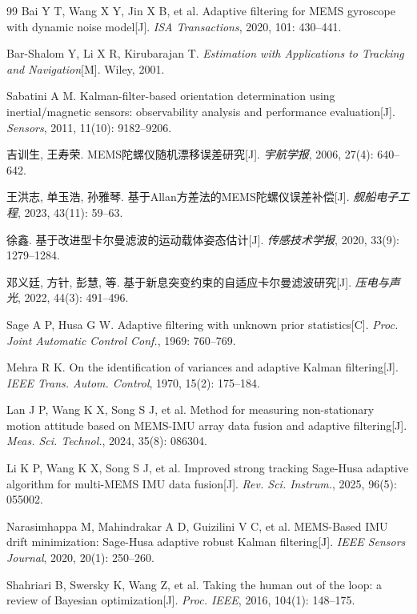 \documentclass{rjthesis}
\begin{document}
\begin{thebibliography}{99}
 Bai Y T, Wang X Y, Jin X B, et al. Adaptive filtering for MEMS gyroscope with dynamic noise model[J]. \textit{ISA Transactions}, 2020, 101: 430--441.

 Bar-Shalom Y, Li X R, Kirubarajan T. \textit{Estimation with Applications to Tracking and Navigation}[M]. Wiley, 2001.

 Sabatini A M. Kalman-filter-based orientation determination using inertial/magnetic sensors: observability analysis and performance evaluation[J]. \textit{Sensors}, 2011, 11(10): 9182--9206.

 吉训生, 王寿荣. MEMS陀螺仪随机漂移误差研究[J]. \textit{宇航学报}, 2006, 27(4): 640--642.

 王洪志, 单玉浩, 孙雅琴. 基于Allan方差法的MEMS陀螺仪误差补偿[J]. \textit{舰船电子工程}, 2023, 43(11): 59--63.

 徐鑫. 基于改进型卡尔曼滤波的运动载体姿态估计[J]. \textit{传感技术学报}, 2020, 33(9): 1279--1284.

 邓义廷, 方针, 彭慧, 等. 基于新息突变约束的自适应卡尔曼滤波研究[J]. \textit{压电与声光}, 2022, 44(3): 491--496.

 Sage A P, Husa G W. Adaptive filtering with unknown prior statistics[C]. \textit{Proc. Joint Automatic Control Conf.}, 1969: 760--769.

 Mehra R K. On the identification of variances and adaptive Kalman filtering[J]. \textit{IEEE Trans. Autom. Control}, 1970, 15(2): 175--184.

 Lan J P, Wang K X, Song S J, et al. Method for measuring non-stationary motion attitude based on MEMS-IMU array data fusion and adaptive filtering[J]. \textit{Meas. Sci. Technol.}, 2024, 35(8): 086304.

 Li K P, Wang K X, Song S J, et al. Improved strong tracking Sage-Husa adaptive algorithm for multi-MEMS IMU data fusion[J]. \textit{Rev. Sci. Instrum.}, 2025, 96(5): 055002.

 Narasimhappa M, Mahindrakar A D, Guizilini V C, et al. MEMS-Based IMU drift minimization: Sage-Husa adaptive robust Kalman filtering[J]. \textit{IEEE Sensors Journal}, 2020, 20(1): 250--260.

 Shahriari B, Swersky K, Wang Z, et al. Taking the human out of the loop: a review of Bayesian optimization[J]. \textit{Proc. IEEE}, 2016, 104(1): 148--175.


\end{thebibliography}
\end{document}
